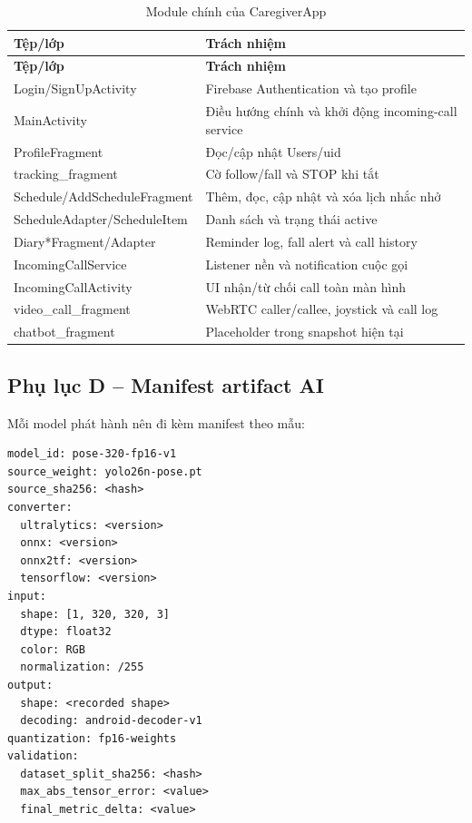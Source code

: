 \begin{longtable}{|p{4.4cm}|p{8.9cm}|}
\caption{Module chính của CaregiverApp}\\
\hline
\textbf{Tệp/lớp} & \textbf{Trách nhiệm} \\
\hline
\endfirsthead
\hline
\textbf{Tệp/lớp} & \textbf{Trách nhiệm} \\
\hline
\endhead
Login/SignUpActivity & Firebase Authentication và tạo profile \\
\hline
MainActivity & Điều hướng chính và khởi động incoming-call service \\
\hline
ProfileFragment & Đọc/cập nhật Users/uid \\
\hline
tracking\_fragment & Cờ follow/fall và STOP khi tắt \\
\hline
Schedule/\allowbreak AddScheduleFragment & Thêm, đọc, cập nhật và xóa lịch nhắc nhở \\
\hline
ScheduleAdapter/\allowbreak ScheduleItem & Danh sách và trạng thái active \\
\hline
Diary*Fragment/\allowbreak Adapter & Reminder log, fall alert và call history \\
\hline
IncomingCallService & Listener nền và notification cuộc gọi \\
\hline
IncomingCallActivity & UI nhận/từ chối call toàn màn hình \\
\hline
video\_call\_fragment & WebRTC caller/callee, joystick và call log \\
\hline
chatbot\_fragment & Placeholder trong snapshot hiện tại \\
\hline
\end{longtable}

\subsection*{Phụ lục D -- Manifest artifact AI}

Mỗi model phát hành nên đi kèm manifest theo mẫu:

\begin{lstlisting}[caption={Mẫu manifest model có thể tái lập}]
model_id: pose-320-fp16-v1
source_weight: yolo26n-pose.pt
source_sha256: <hash>
converter:
  ultralytics: <version>
  onnx: <version>
  onnx2tf: <version>
  tensorflow: <version>
input:
  shape: [1, 320, 320, 3]
  dtype: float32
  color: RGB
  normalization: /255
output:
  shape: <recorded shape>
  decoding: android-decoder-v1
quantization: fp16-weights
validation:
  dataset_split_sha256: <hash>
  max_abs_tensor_error: <value>
  final_metric_delta: <value>
\end{lstlisting}

